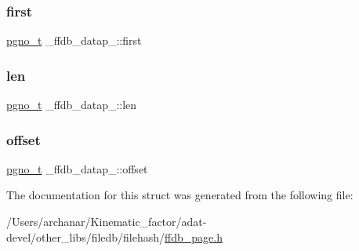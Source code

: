 \mbox{\label{struct__ffdb__datap___a45bb4391f88d605103aaf0f61a10f349}} 
\subsubsection{\texorpdfstring{first}{first}}
{\footnotesize\ttfamily \mbox{\hyperlink{adat-devel_2other__libs_2filedb_2filehash_2ffdb__db_8h_a000813331643d38481142bcce7de1501}{pgno\+\_\+t}} \+\_\+ffdb\+\_\+datap\+\_\+\+::first}

\mbox{\label{struct__ffdb__datap___aec2dc3a3454339039f0c12598e3faad7}} 
\subsubsection{\texorpdfstring{len}{len}}
{\footnotesize\ttfamily \mbox{\hyperlink{adat-devel_2other__libs_2filedb_2filehash_2ffdb__db_8h_a000813331643d38481142bcce7de1501}{pgno\+\_\+t}} \+\_\+ffdb\+\_\+datap\+\_\+\+::len}

\mbox{\label{struct__ffdb__datap___a27c6fdcb05f89592016f8f8cc141560a}} 
\subsubsection{\texorpdfstring{offset}{offset}}
{\footnotesize\ttfamily \mbox{\hyperlink{adat-devel_2other__libs_2filedb_2filehash_2ffdb__db_8h_a000813331643d38481142bcce7de1501}{pgno\+\_\+t}} \+\_\+ffdb\+\_\+datap\+\_\+\+::offset}



The documentation for this struct was generated from the following file\+:\begin{DoxyCompactItemize}
\item 
/\+Users/archanar/\+Kinematic\+\_\+factor/adat-\/devel/other\+\_\+libs/filedb/filehash/\mbox{\hyperlink{adat-devel_2other__libs_2filedb_2filehash_2ffdb__page_8h}{ffdb\+\_\+page.\+h}}\end{DoxyCompactItemize}
